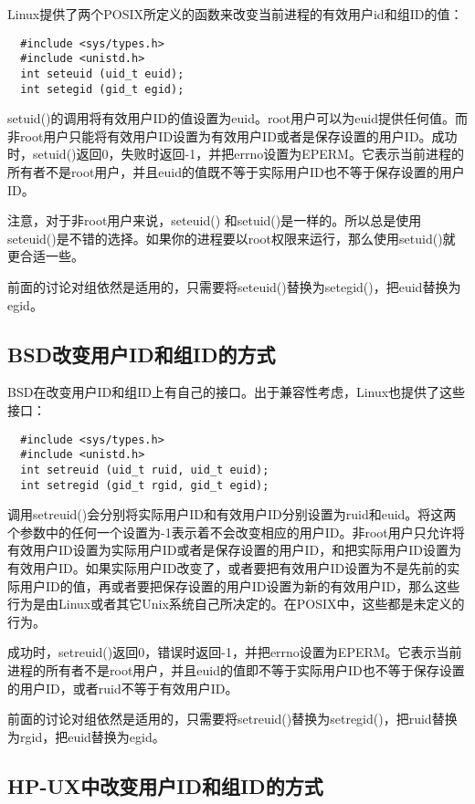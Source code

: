 Linux提供了两个POSIX所定义的函数来改变当前进程的有效用户id和组ID的值：

\begin{lstlisting}
  #include <sys/types.h>
  #include <unistd.h>
  int seteuid (uid_t euid);
  int setegid (gid_t egid);
\end{lstlisting}

setuid()的调用将有效用户ID的值设置为euid。root用户可以为euid提供任何值。而非root用户只能将有效用户ID设置为有效用户ID或者是保存设置的用户ID。成功时，setuid()返回0，失败时返回-1，并把errno设置为EPERM。它表示当前进程的所有者不是root用户，并且euid的值既不等于实际用户ID也不等于保存设置的用户ID。

注意，对于非root用户来说，seteuid() 和setuid()是一样的。所以总是使用seteuid()是不错的选择。如果你的进程要以root权限来运行，那么使用setuid()就更合适一些。

前面的讨论对组依然是适用的，只需要将seteuid()替换为setegid()，把euid替换为egid。

\subsection{BSD改变用户ID和组ID的方式}

BSD在改变用户ID和组ID上有自己的接口。出于兼容性考虑，Linux也提供了这些接口：

\begin{lstlisting}
  #include <sys/types.h>
  #include <unistd.h>
  int setreuid (uid_t ruid, uid_t euid);
  int setregid (gid_t rgid, gid_t egid);
\end{lstlisting}

调用setreuid()会分别将实际用户ID和有效用户ID分别设置为ruid和euid。将这两个参数中的任何一个设置为-1表示着不会改变相应的用户ID。非root用户只允许将有效用户ID设置为实际用户ID或者是保存设置的用户ID，和把实际用户ID设置为有效用户ID。如果实际用户ID改变了，或者要把有效用户ID设置为不是先前的实际用户ID的值，再或者要把保存设置的用户ID设置为新的有效用户ID，那么这些行为是由Linux或者其它Unix系统自己所决定的。在POSIX中，这些都是未定义的行为。

成功时，setreuid()返回0，错误时返回-1，并把errno设置为EPERM。它表示当前进程的所有者不是root用户，并且euid的值即不等于实际用户ID也不等于保存设置的用户ID，或者ruid不等于有效用户ID。

前面的讨论对组依然是适用的，只需要将setreuid()替换为setregid()，把ruid替换为rgid，把euid替换为egid。

\subsection{HP-UX中改变用户ID和组ID的方式}

